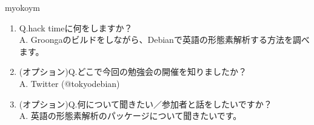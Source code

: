 \begin{prework}{ myokoym }
  \begin{enumerate}
  \item Q.hack timeに何をしますか？\\
    A. Groongaのビルドをしながら、Debianで英語の形態素解析する方法を調べます。
  \item (オプション)Q.どこで今回の勉強会の開催を知りましたか？\\
    A. Twitter (@tokyodebian)
  \item (オプション)Q.何について聞きたい／参加者と話をしたいですか？\\
    A. 英語の形態素解析のパッケージについて聞きたいです。
  \end{enumerate}
\end{prework}
